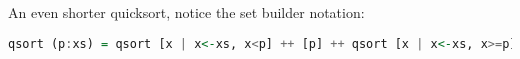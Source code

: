 \documentclass[presentation.tex]{subfiles}
\begin{document}
\begin{frame}[fragile]
  \vspace{\baselineskip}
  An even shorter quicksort, notice the set builder notation:

  \begin{lstlisting}[language=Haskell]
    qsort (p:xs) = qsort [x | x<-xs, x<p] ++ [p] ++ qsort [x | x<-xs, x>=p]
  \end{lstlisting}
\end{frame}


\end{document}
